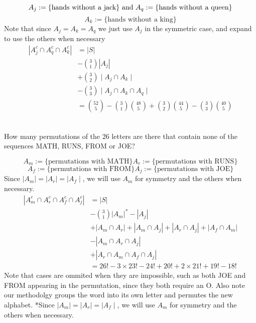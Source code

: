 \documentclass[12pt,letterpaper,boxed]{hmcpset}
\begin{document}
\begin{solution}%
\[
A_j:= \{ \text{hands without a jack} \} \text{ and }\\
A_q:= \{ \text{hands without a queen} \}\\
\] \[
A_k:= \{ \text{hands without a king} \}
\]
Note that since $A_j = A_k = A_q$ we just use $A_j$ in the symmetric case, and expand to use the others when necessary
\begin{align*}
|A_j^c \cap A_q^c \cap A_k^c | &= |S| \\
& - \binom{3}{1}|A_j|  \\
& + \binom{3}{2} \mid A_j \cap A_k \mid \\
&-\binom{3}{3}\mid A_j \cap A_k \cap A_q \mid\\
&=\boxed{\binom{52}{5}-\binom{3}{1}\binom{48}{5}+\binom{3}{2}\binom{44}{5} -\binom{3}{3}\binom{40}{5}}
\end{align*}
\end{solution}



\begin{problem}[Shahriari 8.1.14][20]\\
How many permutations of the 26 letters are there that contain none of the sequences MATH, RUNS, FROM or JOE?
\end{problem}

\begin{solution}
\[
A_m:= \{ \text{permutations with MATH} \}
A_r:= \{ \text{permutations with RUNS} \}
\] \[
A_f:= \{ \text{permutations with FROM} \}
A_j:= \{ \text{permutations with JOE} \}
\]
Since $\mid A_m \mid=\mid A_r \mid=\mid A_f \mid$, we will use $A_m$ for symmetry and the others when necessary.
\begin{align*}
|A_m^c \cap A_r^c \cap A_f^c \cap A_j^c| &= |S| \\
& - \binom{3}{1}|A_m|^*- |A_j| \\
& + |A_m \cap A_r| + |A_m \cap A_j| + |A_r \cap A_j| + |A_f \cap A_m | \\
&-|A_m \cap A_r \cap A_j|\\
&+|A_r \cap A_m \cap A_f \cap  A_j|\\
&=\boxed{26!-3 \times 23! - 24!+ 20! + 2 \times 21! + 19! - 18!}
\end{align*}
Note that cases are ommited when they are impossible, such as both JOE and FROM appearing in the permutation, since they both require an O. Also note our methodolgy groups the word into its own letter and permutes the new alphabet.
*Since $\mid A_m \mid=\mid A_r \mid=\mid A_f \mid$, we will use $A_m$ for symmetry and the others when necessary.
\end{solution}
\end{document}
